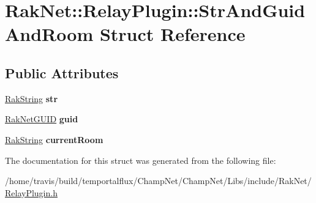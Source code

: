 \hypertarget{struct_rak_net_1_1_relay_plugin_1_1_str_and_guid_and_room}{\section{Rak\-Net\-:\-:Relay\-Plugin\-:\-:Str\-And\-Guid\-And\-Room Struct Reference}
\label{struct_rak_net_1_1_relay_plugin_1_1_str_and_guid_and_room}
}
\subsection*{Public Attributes}
\begin{DoxyCompactItemize}
\item 
\hypertarget{struct_rak_net_1_1_relay_plugin_1_1_str_and_guid_and_room_a6da081d6064799aad1503c9dce66c030}{\hyperlink{class_rak_net_1_1_rak_string}{Rak\-String} {\bfseries str}}\label{struct_rak_net_1_1_relay_plugin_1_1_str_and_guid_and_room_a6da081d6064799aad1503c9dce66c030}

\item 
\hypertarget{struct_rak_net_1_1_relay_plugin_1_1_str_and_guid_and_room_abfc157bcfc42e9191774d1718c5a0c73}{\hyperlink{struct_rak_net_1_1_rak_net_g_u_i_d}{Rak\-Net\-G\-U\-I\-D} {\bfseries guid}}\label{struct_rak_net_1_1_relay_plugin_1_1_str_and_guid_and_room_abfc157bcfc42e9191774d1718c5a0c73}

\item 
\hypertarget{struct_rak_net_1_1_relay_plugin_1_1_str_and_guid_and_room_aed818478bd8d8f0ce8f13b0d667624a2}{\hyperlink{class_rak_net_1_1_rak_string}{Rak\-String} {\bfseries current\-Room}}\label{struct_rak_net_1_1_relay_plugin_1_1_str_and_guid_and_room_aed818478bd8d8f0ce8f13b0d667624a2}

\end{DoxyCompactItemize}


The documentation for this struct was generated from the following file\-:\begin{DoxyCompactItemize}
\item 
/home/travis/build/temportalflux/\-Champ\-Net/\-Champ\-Net/\-Libs/include/\-Rak\-Net/\hyperlink{_relay_plugin_8h}{Relay\-Plugin.\-h}\end{DoxyCompactItemize}
